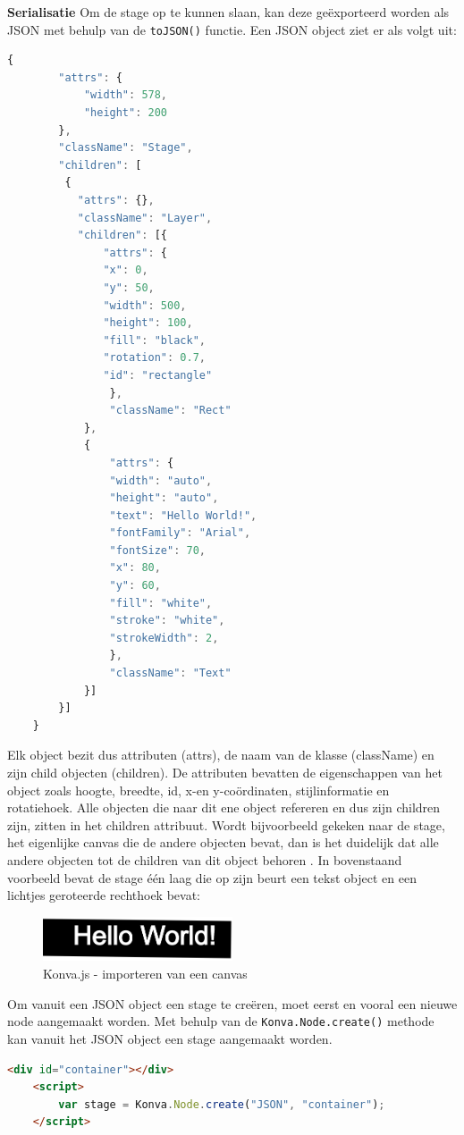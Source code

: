 \textbf{Serialisatie} \break
Om de stage op te kunnen slaan, kan deze ge\"{e}xporteerd worden als JSON met behulp van de \texttt{toJSON()} functie. Een JSON object ziet er als volgt uit:

\begin{lstlisting}[caption={Konva.js JSON object},label=lst:KonvaJSON,language=javascript]
	{
		"attrs": {
		 	"width": 578,
		 	"height": 200
		},
		"className": "Stage",
		"children": [
		 {
		   "attrs": {},
		   "className": "Layer",
		   "children": [{
			   "attrs": {
			   "x": 0,
			   "y": 50,
			   "width": 500,
			   "height": 100,
			   "fill": "black",
			   "rotation": 0.7,
			   "id": "rectangle"
		   		},
		  		"className": "Rect"
	   		},
	   		{
				"attrs": {
				"width": "auto",
				"height": "auto",
				"text": "Hello World!",
				"fontFamily": "Arial",
				"fontSize": 70,
				"x": 80,
				"y": 60,
				"fill": "white",
				"stroke": "white",
				"strokeWidth": 2,
		   		},
	   			"className": "Text"
			}]
	 	}]
	}
\end{lstlisting}

Elk object bezit dus attributen (attrs), de naam van de klasse (className) en zijn child objecten (children).  De attributen bevatten de eigenschappen van het object zoals hoogte, breedte, id, x-en y-co\"{o}rdinaten, stijlinformatie en rotatiehoek. Alle objecten die naar dit ene object refereren en dus zijn children zijn, zitten in het children attribuut. Wordt bijvoorbeeld gekeken naar de stage, het eigenlijke canvas die de andere objecten bevat, dan is het duidelijk dat alle andere objecten tot de children van dit object behoren \cite{KonvaSerialize}. In bovenstaand voorbeeld bevat de stage \'{e}\'{e}n laag die op zijn beurt een tekst object en een lichtjes geroteerde rechthoek bevat: %

\begin{figure}[H]
	\centering
	\includegraphics[width=0.5\textwidth]{Figuren/KonvaJSLoadFromJSON.png}
	\caption{Konva.js - importeren van een canvas} 
	\label{fig:KonvaJSLoadFromJSON}
\end{figure} 

Om vanuit een JSON object een stage te cre\"{e}ren, moet eerst en vooral een nieuwe node aangemaakt worden. Met behulp van de \texttt{Konva.Node.create()} methode kan vanuit het JSON object een stage aangemaakt worden. 
\begin{lstlisting}[caption={Aanmaken van een canvas},label=lst:KonvaCreation,language=HTML]
	<div id="container"></div>
	<script>
		var stage = Konva.Node.create("JSON", "container");
	</script>
\end{lstlisting}

